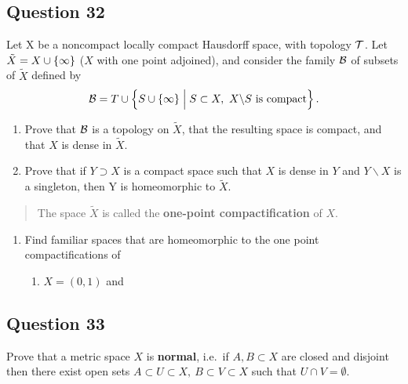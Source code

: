 \documentclass[12pt]{article}
\providecommand{\tightlist}{%
  \setlength{\itemsep}{0pt}\setlength{\parskip}{0pt}}
\begin{document}
\hypertarget{question-32-3}{%
\subsection{Question 32}\label{question-32-3}}

Let X be a noncompact locally compact Hausdorff space, with topology
\({\mathcal{T}}\). Let \(\tilde X = X \cup \left\{{\infty}\right\}\) (\(X\) with one
point adjoined), and consider the family \({\mathcal{B}}\) of subsets of
\(\tilde X\) defined by \[
{\mathcal{B}} = T \cup \left\{{S \cup \left\{{\infty}\right\}\mathrel{\Big|} S \subset X,~~ X \backslash S \text{ is compact}}\right\}
.\]

\begin{enumerate}
\def\labelenumi{\alph{enumi}.}
\item
  Prove that \({\mathcal{B}}\) is a topology on \(\tilde X\), that the resulting
  space is compact, and that \(X\) is dense in \(\tilde X\).
\item
  Prove that if \(Y \supset X\) is a compact space such that \(X\) is
  dense in \(Y\) and \(Y \backslash X\) is a singleton, then Y is
  homeomorphic to \(\tilde X\).
\end{enumerate}

\begin{quote}
The space \(\tilde X\) is called the \textbf{one-point compactification}
of \(X\).
\end{quote}

\begin{enumerate}
\def\labelenumi{\alph{enumi}.}
\setcounter{enumi}{2}
\item
  Find familiar spaces that are homeomorphic to the one point
  compactifications of

  \begin{enumerate}
  \def\labelenumii{\roman{enumii}.}
  \tightlist
  \item
    \(X = (0, 1)\) and
  \end{enumerate}
\end{enumerate}

\hypertarget{question-33-3}{%
\subsection{Question 33}\label{question-33-3}}

Prove that a metric space \(X\) is \textbf{normal}, i.e.~if
\(A, B \subset X\) are closed and disjoint then there exist open sets
\(A \subset U \subset X, ~B \subset V \subset X\) such that
\(U \cap V = \emptyset\).
\end{document}
